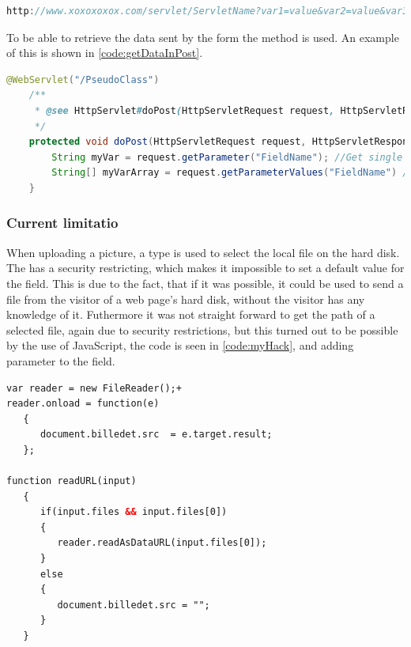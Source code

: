 \begin{lstlisting}[language=Java,label=code:URLLINK,caption=URL with visible parameters]
http://www.xoxoxoxox.com/servlet/ServletName?var1=value&var2=value&var3=value
\end{lstlisting}

To be able to retrieve the data sent by the form the  method is used. An example of this is shown in \autoref{code:getDataInPost}.

\begin{lstlisting}[language=Java,label=code:getDataInPost,caption=How to read parameters]
	@WebServlet("/PseudoClass")
	/**
	 * @see HttpServlet#doPost(HttpServletRequest request, HttpServletResponse response)
	 */
	protected void doPost(HttpServletRequest request, HttpServletResponse response) throws ServletException, IOException {
		String myVar = request.getParameter("FieldName"); //Get single Value
		String[] myVarArray = request.getParameterValues("FieldName") //Get string array
	}
\end{lstlisting}

\subsubsection{Current limitatio}
When uploading a picture, a  type is used to select the local file on the hard disk. The  has a security restricting, which makes it impossible to set a default value for the field. This is due to the fact, that if it was possible, it could be used to send a file from the visitor of a web page's hard disk, without the visitor has any knowledge of it\cite{noFile}. Futhermore it was not straight forward to get the path of a selected file, again due to security restrictions, but this turned out to be possible by the use of JavaScript, the code is seen in \autoref{code:myHack}, and adding parameter  to the  field.

\begin{lstlisting}[language=HTML,label=code:myHack,caption=Hack to load file from \code{file} box]
var reader = new FileReader();+
reader.onload = function(e) 
   {
      document.billedet.src  = e.target.result;
   };

function readURL(input)
   {
      if(input.files && input.files[0])
      {
         reader.readAsDataURL(input.files[0]);
      }
      else 
      {
         document.billedet.src = "";
      }
   }
\end{lstlisting}

